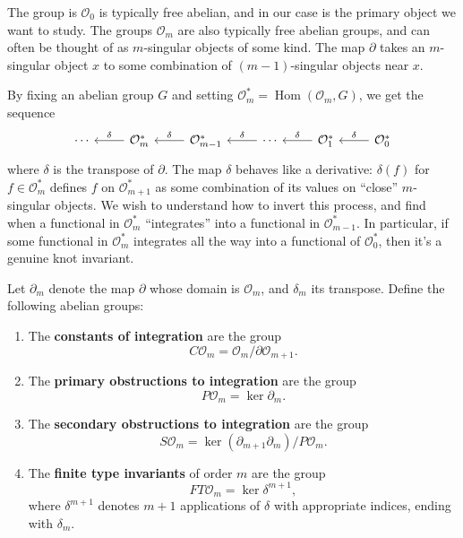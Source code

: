 The group is \(\mathcal{O}_{0}\) is typically free abelian, and in our case is the primary object we want to study. The groups \(\mathcal{O}_{m}\) are also typically free abelian groups, and can often be thought of as \(m\)-singular objects of some kind. The map \(\partial\) takes an \(m\)-singular object \(x\) to some combination of \((m - 1)\)-singular objects near \(x\).

By fixing an abelian group \(G\) and setting \(\mathcal{O}_{m}^{\ast} = \operatorname{Hom}(\mathcal{O}_{m}, G)\), we get the sequence
\[\begin{tikzcd}
	\cdots & {\mathcal{O}_{m}^{\ast}} & {\mathcal{O}_{m - 1}^{\ast}} & \cdots & {\mathcal{O}_{1}^{\ast}} & {\mathcal{O}_{0}^{\ast}}
	\arrow["\delta"', from=1-2, to=1-1]
	\arrow["\delta"', from=1-3, to=1-2]
	\arrow["\delta"', from=1-4, to=1-3]
	\arrow["\delta"', from=1-5, to=1-4]
	\arrow["\delta"', from=1-6, to=1-5]
\end{tikzcd}\]
where \(\delta\) is the transpose of \(\partial\). The map \(\delta\) behaves like a derivative: \(\delta(f)\) for \(f \in \mathcal{O}_{m}^{\ast}\) defines \(f\) on \(\mathcal{O}_{m + 1}^{\ast}\) as some combination of its values on ``close'' \(m\)-singular objects. We wish to understand how to invert this process, and find when a functional in \(\mathcal{O}_{m}^{\ast}\) ``integrates'' into a functional in \(\mathcal{O}_{m - 1}^{\ast}\). In particular, if some functional in \(\mathcal{O}_{m}^{\ast}\) integrates all the way into a functional of \(\mathcal{O}_{0}^{\ast}\), then it's a genuine knot invariant.

\begin{definitions} Let \(\partial_{m}\) denote the map \(\partial\) whose domain is \(\mathcal{O}_{m}\), and \(\delta_{m}\) its transpose. Define the following abelian groups:
	\begin{enumerate}
		\item The \textbf{constants of integration} are the group
			\[C\mathcal{O}_{m} = \mathcal{O}_{m} / \partial \mathcal{O}_{m + 1}.\]
		\item The \textbf{primary obstructions to integration} are the group
			\[P\mathcal{O}_{m} = \ker{\partial_{m}}.\]
		\item The \textbf{secondary obstructions to integration} are the group
			\[S\mathcal{O}_{m} = \ker{(\partial_{m + 1}\partial_{m})} / P\mathcal{O}_{m}.\]
		\item The \textbf{finite type invariants} of order \(m\) are the group
			\[FT\mathcal{O}_{m} = \ker \delta^{m + 1},\]
			where \(\delta^{m + 1}\) denotes \(m + 1\) applications of \(\delta\) with appropriate indices, ending with \(\delta_{m}\).

	\end{enumerate}
\end{definitions}

